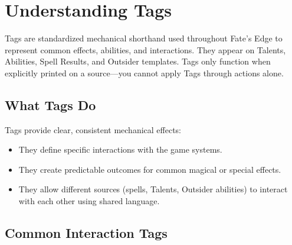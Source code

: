 \section{Understanding Tags}

Tags are standardized mechanical shorthand used throughout Fate's Edge to represent common effects, abilities, and interactions. They appear on Talents, Abilities, Spell Results, and Outsider templates. Tags only function when explicitly printed on a source—you cannot apply Tags through actions alone.

\subsection*{What Tags Do}

Tags provide clear, consistent mechanical effects:
\begin{itemize}
  \item They define specific interactions with the game systems.
  \item They create predictable outcomes for common magical or special effects.
  \item They allow different sources (spells, Talents, Outsider abilities) to interact with each other using shared language.
\end{itemize}

\subsection*{Common Interaction Tags}

